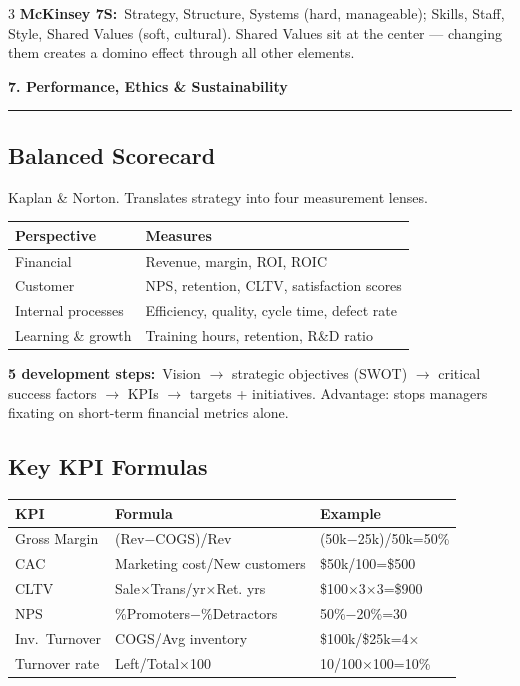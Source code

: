 \documentclass[7.6pt,letterpaper]{article}
\newcommand{\secbar}[1]{%
    \vspace{2pt}\noindent\textbf{#1}\par\vspace{1pt}\hrule\vspace{2pt}%
  }
\newcommand{\secbar}[1]{%
    \vspace{3pt}%
    \noindent\colorbox{navy}{\parbox{\dimexpr\linewidth-2\fboxsep}{%
      \fontsize{6.8pt}{8pt}\sffamily\bfseries\color{white}\strut\ #1\strut}}%
    \vspace{1pt}\par%
  }
\newcommand{\T}[1]{\textbf{\color{navy}#1}}
\newcommand{\kk}[2]{\noindent\T{#1}\ #2\par}
\newcommand{\sh}{\rowcolor{strip}}
\newcommand{\ctab}[1]{{\fontsize{6.2pt}{7pt}\selectfont\setlength{\tabcolsep}{2.5pt}#1}}
\begin{document}
\begin{multicols}{3}
\kk{McKinsey 7S:}{Strategy, Structure, Systems (hard, manageable); Skills, Staff, Style, Shared Values (soft, cultural). Shared Values sit at the center --- changing them creates a domino effect through all other elements.}

\secbar{7. Performance, Ethics \& Sustainability}

\subsection{Balanced Scorecard}

Kaplan \& Norton. Translates strategy into four measurement lenses.

\ctab{\begin{tabular}{@{}p{1.5cm}p{4.1cm}@{}}
\toprule
\sh \T{Perspective} & \T{Measures} \\
\midrule
Financial & Revenue, margin, ROI, ROIC \\
Customer & NPS, retention, CLTV, satisfaction scores \\
Internal processes & Efficiency, quality, cycle time, defect rate \\
Learning \& growth & Training hours, retention, R\&D ratio \\
\bottomrule
\end{tabular}}

\kk{5 development steps:}{Vision $\to$ strategic objectives (SWOT) $\to$ critical success factors $\to$ KPIs $\to$ targets + initiatives. Advantage: stops managers fixating on short-term financial metrics alone.}

\subsection{Key KPI Formulas}

\ctab{\begin{tabular}{@{}p{1.4cm}p{2.7cm}p{1.5cm}@{}}
\toprule
\sh \T{KPI} & \T{Formula} & \T{Example} \\
\midrule
Gross Margin & (Rev$-$COGS)/Rev & (50k$-$25k)/50k=50\% \\
CAC & Marketing cost/New customers & \$50k/100=\$500 \\
CLTV & Sale$\times$Trans/yr$\times$Ret. yrs & \$100$\times$3$\times$3=\$900 \\
NPS & \%Promoters$-$\%Detractors & 50\%$-$20\%=30 \\
Inv.\ Turnover & COGS/Avg inventory & \$100k/\$25k=4$\times$ \\
Turnover rate & Left/Total$\times$100 & 10/100$\times$100=10\% \\
\bottomrule
\end{tabular}}


\end{multicols}
\end{document}
